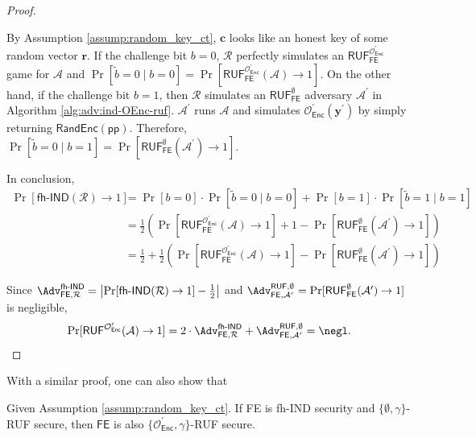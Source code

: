 \begin{proof}
\begin{figure}[h]
\end{figure}

By Assumption \ref{assump:random_key_ct}, $\mathbf{c}$ looks like an honest key of some random vector $\mathbf{r}$. If the challenge bit $b = 0$, $\mathcal{R}$ perfectly simulates an $\textsf{RUF}^{\mathcal{O}^\prime_{\textsf{Enc}}}_{\textsf{FE}}$ game for $\mathcal{A}$ and $\Pr[\tilde{b} = 0 \mid b = 0] = \Pr[ \textsf{RUF}^{\mathcal{O}^\prime_{\textsf{Enc}}}_{\textsf{FE}}(\mathcal{A}) \to 1 ]$. On the other hand, if the challenge bit $b = 1$, then $\mathcal{R}$ simulates an $\textsf{RUF}^{\emptyset}_{\textsf{FE}}$ adversary $\mathcal{A}^\prime$ in Algorithm \ref{alg:adv:ind-OEnc-ruf}. $\mathcal{A}^\prime$ runs $\mathcal{A}$ and simulates $\mathcal{O}^\prime_{\textsf{Enc}}(\mathbf{y}^\prime)$ by simply returning $\textsf{RandEnc}(\textsf{pp})$. Therefore, $\Pr[\tilde{b} = 0 \mid b = 1] = \Pr[ \textsf{RUF}^{\emptyset}_{\textsf{FE}}(\mathcal{A}^\prime) \to 1 ]$.

In conclusion,
\begin{align*}
	\Pr[\textsf{fh-IND}(\mathcal{R}) \to 1] 
	&= \Pr[b = 0] \cdot \Pr[\tilde{b} = 0 \mid b = 0] + \Pr[b = 1] \cdot \Pr[\tilde{b} = 1 \mid b = 1] \\
	&= \frac{1}{2} \left( \Pr[\textsf{RUF}^{\mathcal{O}^\prime_{\textsf{Enc}}}_{\textsf{FE}}(\mathcal{A}) \to 1] + 1 - \Pr[ \textsf{RUF}^{\emptyset}_{\textsf{FE}}(\mathcal{A}^\prime) \to 1 ] \right) \\
	&= \frac{1}{2} + \frac{1}{2} \left( \Pr[\textsf{RUF}^{\mathcal{O}^\prime_{\textsf{Enc}}}_{\textsf{FE}}(\mathcal{A}) \to 1] - \Pr[ \textsf{RUF}^{\emptyset}_{\textsf{FE}}(\mathcal{A}^\prime) \to 1 ] \right)
\end{align*}

Since $\Adv_{\textsf{FE}, \mathcal{R}}^\textsf{fh-IND} = \left| \Pr[\textsf{fh-IND}(\mathcal{R}) \to 1] - \frac{1}{2} \right|$ and $\Adv_{\textsf{FE}, \mathcal{A}^\prime }^{\textsf{RUF}, \emptyset} = \Pr[\textsf{RUF}^{\emptyset}_{\textsf{FE}}(\mathcal{A}^\prime) \to 1 ]$ is negligible,
\[
	\Pr[ \textsf{RUF}^{\mathcal{O}^\prime_{\textsf{Enc}}}(\mathcal{A}) \to 1]  = 2 \cdot \Adv_{\textsf{FE}, \mathcal{R}}^\textsf{fh-IND} + \Adv_{\textsf{FE}, \mathcal{A}^\prime }^{\textsf{RUF}, \emptyset} = \negl.
\]

\end{proof}

With a similar proof, one can also show that

\begin{theorem}
\label{thm:fh-IPFE:ind-OEnc-gamma-ruf}
Given Assumption \ref{assump:random_key_ct}. If \textsf{FE} is fh-IND security and $\{ \emptyset, \gamma \}$-RUF secure, then $\textsf{FE}$ is also $\{ \mathcal{O}^\prime_{\textsf{Enc}}, \gamma \}$-RUF secure.

\end{theorem}

